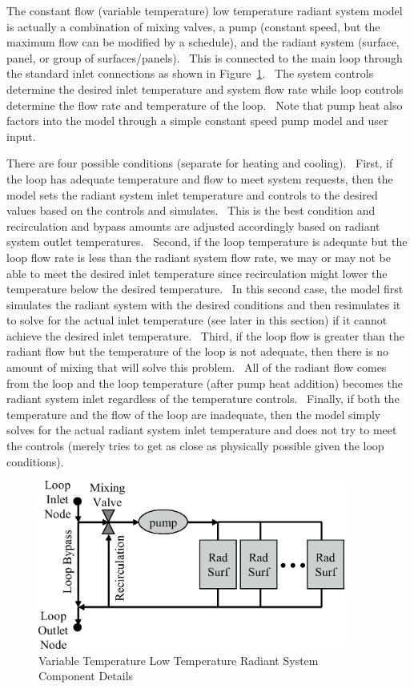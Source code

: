 The constant flow (variable temperature) low temperature radiant system model is actually a combination of mixing valves, a pump (constant speed, but the maximum flow can be modified by a schedule), and the radiant system (surface, panel, or group of surfaces/panels).~ This is connected to the main loop through the standard inlet connections as shown in Figure~\ref{fig:variable-temperature-low-temperature-radiant-001}.~ The system controls determine the desired inlet temperature and system flow rate while loop controls determine the flow rate and temperature of the loop.~ Note that pump heat also factors into the model through a simple constant speed pump model and user input.

There are four possible conditions (separate for heating and cooling).~ First, if the loop has adequate temperature and flow to meet system requests, then the model sets the radiant system inlet temperature and controls to the desired values based on the controls and simulates.~ This is the best condition and recirculation and bypass amounts are adjusted accordingly based on radiant system outlet temperatures.~ Second, if the loop temperature is adequate but the loop flow rate is less than the radiant system flow rate, we may or may not be able to meet the desired inlet temperature since recirculation might lower the temperature below the desired temperature.~ In this second case, the model first simulates the radiant system with the desired conditions and then resimulates it to solve for the actual inlet temperature (see later in this section) if it cannot achieve the desired inlet temperature.~ Third, if the loop flow is greater than the radiant flow but the temperature of the loop is not adequate, then there is no amount of mixing that will solve this problem.~ All of the radiant flow comes from the loop and the loop temperature (after pump heat addition) becomes the radiant system inlet regardless of the temperature controls.~ Finally, if both the temperature and the flow of the loop are inadequate, then the model simply solves for the actual radiant system inlet temperature and does not try to meet the controls (merely tries to get as close as physically possible given the loop conditions).

\begin{figure}[hbtp] %
\centering
\includegraphics[width=0.9\textwidth, height=0.9\textheight, keepaspectratio=true]{media/image6055.png}
\caption{Variable Temperature Low Temperature Radiant System Component Details \protect \label{fig:variable-temperature-low-temperature-radiant-001}}
\end{figure}

